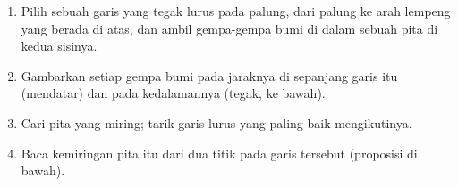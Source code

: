 \begin{method}\label{met:g11:subduction-zones:section}
\begin{enumerate}
  \item Pilih sebuah garis yang tegak lurus pada palung, dari palung ke arah
        lempeng yang berada di atas, dan ambil gempa-gempa bumi di dalam
        sebuah pita di kedua sisinya.
  \item Gambarkan setiap gempa bumi pada jaraknya di sepanjang garis itu
        (mendatar) dan pada kedalamannya (tegak, ke bawah).
  \item Cari pita yang miring; tarik garis lurus yang paling baik
        mengikutinya.
  \item Baca kemiringan pita itu dari dua titik pada garis tersebut (proposisi
        di bawah).
\end{enumerate}
\end{method}


